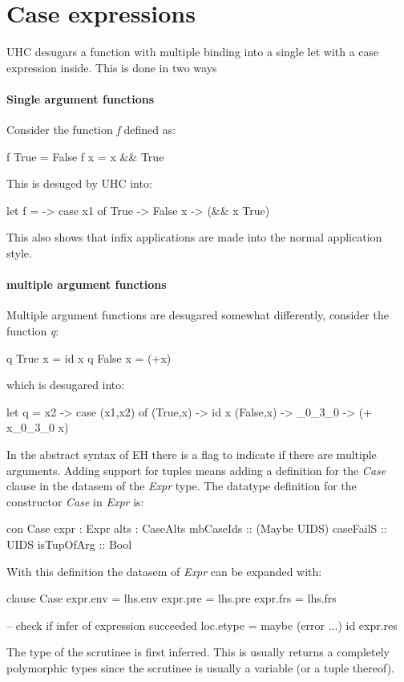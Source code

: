 \section{Case expressions}
UHC desugars a function with multiple binding into a single let with a case expression inside. This is done in two ways
\paragraph{Single argument functions}
Consider the function \emph{f} defined as:
\begin{code}
f True  = False
f x     = x && True
\end{code}
This is desuged by UHC into:
\begin{code}
let f =  -> case x1 of
                 True -> False
                 x -> (&& x True)
\end{code}
This also shows that infix applications are made into the normal application style.

\paragraph{multiple argument functions}
Multiple argument functions are desugared somewhat differently, consider the function \emph{q}:
\begin{code}
q True  x = id x
q False x = (+x)
\end{code}
which is desugared into:
\begin{code}
let q =  x2 -> case (x1,x2) of
                    (True,x) -> id x
                    (False,x) -> \x_0_3_0 -> (+ x_0_3_0 x)
\end{code}

In the abstract syntax of EH there is a flag to indicate if there are multiple arguments. Adding support for tuples means adding a definition for the \emph{Case} clause in the datasem of the \emph{Expr} type. The datatype definition for the constructor \emph{Case} in \emph{Expr} is:
\begin{code}
  con Case
    expr          :  Expr
    alts          :  CaseAlts
    mbCaseIds     :: (Maybe UIDS)
    caseFailS     :: UIDS
    isTupOfArg    :: Bool
\end{code}

With this definition the datasem of \emph{Expr} can be expanded with:

\begin{code}
   clause Case
      expr.env  = lhs.env
      expr.pre  = lhs.pre
      expr.frs  = lhs.frs
      
      -- check if infer of expression succeeded
      loc.etype = maybe (error ...) id expr.res
\end{code}
The type of the scrutinee is first inferred. This is usually returns a completely polymorphic types since the scrutinee is usually a variable (or a tuple thereof). 


